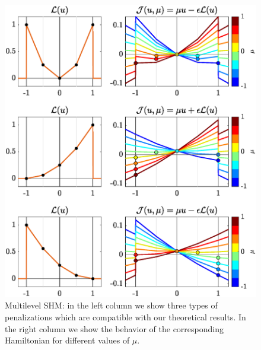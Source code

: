 \documentclass[twocolumn]{autart}    %
\begin{document}
\begin{figure}[h]
	\includegraphics[scale=0.415]{img/fig04.eps}
	\caption{Multilevel SHM: in the left column we show three types of penalizations which are compatible with our theoretical results. In the right column we show the behavior of the corresponding Hamiltonian for different values of $\mu$.}\label{fig:SHE-multi}
\end{figure} 
\end{document}
